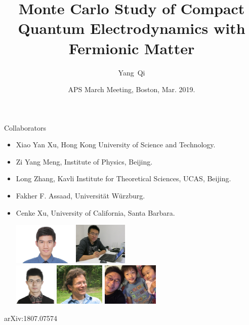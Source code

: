 \documentclass[xcolor=table, 10pt, aspectratio=169]{beamer}
\title[U1SL] %
{Monte Carlo Study of Compact Quantum Electrodynamics with Fermionic Matter}
\author[Y Qi] %
{Yang~Qi}
\institute[Fudan] %
{
Department of Physics, Fudan University.
}
\date{APS March Meeting, Boston, Mar. 2019.}
\begin{document}
\begin{frame}
  \titlepage
\end{frame}

\begin{frame}{Collaborators}
\begin{itemize}
\item Xiao Yan Xu, Hong Kong University of Science and Technology.
\item Zi Yang Meng, Institute of Physics, Beijing.
\item Long Zhang, Kavli Institute for Theoretical Sciences, UCAS, Beijing.
\item Fakher F. Assaad, Universit\"at W\"urzburg.
\item Cenke Xu, University of California, Santa Barbara.
\begin{center}
  \includegraphics[height=2cm]{../people/xiaoyanxu}
  \includegraphics[height=2cm]{../people/ziyangmeng}\\
  \includegraphics[height=2cm]{../people/zhanglong}
  \includegraphics[height=2cm]{../people/fakher}
  \includegraphics[height=2cm]{../people/cenke}
\end{center}
\end{itemize}
\begin{center}
  \small arXiv:1807.07574
\end{center}
\end{frame}
\end{document}
